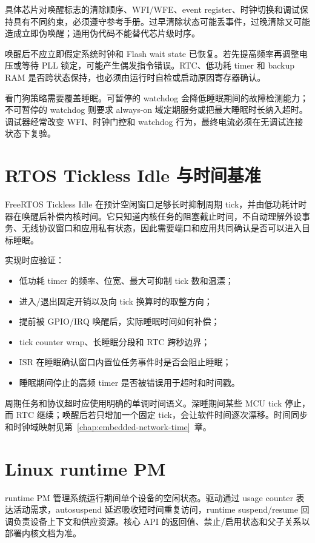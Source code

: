 具体芯片对唤醒标志的清除顺序、WFI/WFE、event register、时钟切换和调试保持具有不同约束，必须遵守参考手册。过早清除状态可能丢事件，过晚清除又可能造成立即伪唤醒；通用伪代码不能替代芯片级时序。

唤醒后不应立即假定系统时钟和 Flash wait state 已恢复。若先提高频率再调整电压或等待 PLL 锁定，可能产生偶发指令错误。RTC、低功耗 timer 和 backup RAM 是否跨状态保持，也必须由运行时自检或启动原因寄存器确认。

看门狗策略需要覆盖睡眠。可暂停的 watchdog 会降低睡眠期间的故障检测能力；不可暂停的 watchdog 则要求 always-on 域定期服务或把最大睡眠时长纳入超时。调试器经常改变 WFI、时钟门控和 watchdog 行为，最终电流必须在无调试连接状态下复验。

\section{RTOS Tickless Idle 与时间基准}

FreeRTOS Tickless Idle 在预计空闲窗口足够长时抑制周期 tick，并由低功耗计时器在唤醒后补偿内核时间\cite{freertos-kernel-book}。它只知道内核任务的阻塞截止时间，不自动理解外设事务、无线协议窗口和应用私有状态，因此需要端口和应用共同确认是否可以进入目标睡眠。

实现时应验证：

\begin{itemize}
  \item 低功耗 timer 的频率、位宽、最大可抑制 tick 数和温漂；
  \item 进入/退出固定开销以及向 tick 换算时的取整方向；
  \item 提前被 GPIO/IRQ 唤醒后，实际睡眠时间如何补偿；
  \item tick counter wrap、长睡眠分段和 RTC 跨秒边界；
  \item ISR 在睡眠确认窗口内置位任务事件时是否会阻止睡眠；
  \item 睡眠期间停止的高频 timer 是否被错误用于超时和时间戳。
\end{itemize}

周期任务和协议超时应使用明确的单调时间语义。深睡期间某些 MCU tick 停止，而 RTC 继续；唤醒后若只增加一个固定 tick，会让软件时间逐次漂移。时间同步和时钟域映射见\mbox{第~\ref{chap:embedded-network-time}~章}。

\section{Linux runtime PM}

runtime PM 管理系统运行期间单个设备的空闲状态。驱动通过 usage counter 表达活动需求，autosuspend 延迟吸收短时间重复访问，runtime suspend/resume 回调负责设备上下文和供应资源。核心 API 的返回值、禁止/启用状态和父子关系以部署内核文档为准\cite{linux-runtime-pm}。

